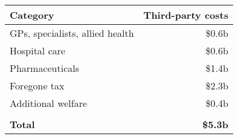 \bgroup
\def\arraystretch{1.2}
\begin{tabular}{lr}
\toprule
\textbf{Category} & \textbf{Third-party costs} \\ 
\midrule
GPs, specialists, allied health & \$0.6b \\
Hospital care & \$0.6b\\
Pharmaceuticals & \$1.4b \\
Foregone tax & \$2.3b\\
Additional welfare & \$0.4b\\
 & \\[-10pt] 
\textbf{Total} & \textbf{\$5.3b} \\
\bottomrule
\end{tabular}
\egroup